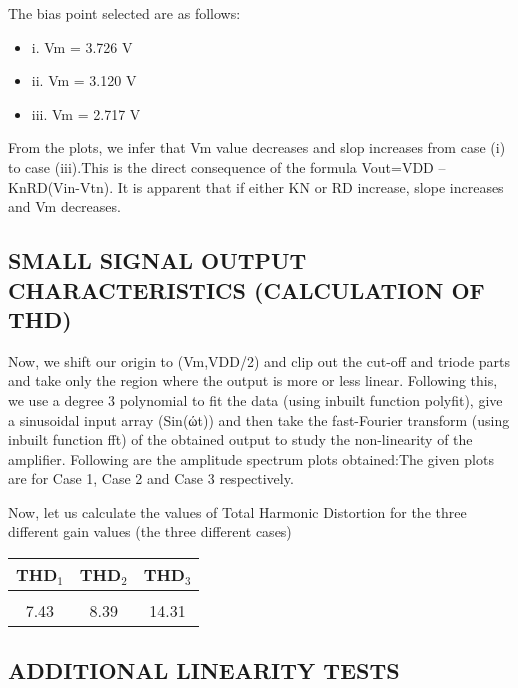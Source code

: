 \documentclass[12pt]{article}
\begin{document}
The bias point selected are as follows:

\begin{itemize}
\item i. Vm = 3.726 V

\item ii. Vm = 3.120 V

\item iii. Vm = 2.717 V
\end{itemize}

From the plots, we infer that Vm value decreases and slop increases from case (i) to case (iii).This is the direct consequence of the formula Vout=VDD – KnRD(Vin-Vtn). It is apparent that if either KN or RD increase, slope increases and Vm decreases.


\subsection*{SMALL SIGNAL OUTPUT CHARACTERISTICS (CALCULATION OF THD)}

Now, we shift our origin to (Vm,VDD/2) and clip out the cut-off and triode parts and take only the region where the output is more or less linear. Following this, we use a degree 3 polynomial to fit the data (using inbuilt function polyfit), give a sinusoidal input array (Sin(ώt)) and then take the fast-Fourier transform (using inbuilt function fft) of the obtained output to study the non-linearity of the amplifier. Following are the amplitude spectrum plots obtained:The given plots are for Case 1, Case 2 and Case 3 respectively.

Now, let us calculate the values of Total Harmonic Distortion for the three
different gain values (the three different cases)
\begin{center}
 \begin{tabular}{|| c | c| c ||}
 \hline
 \hline
 THD$_1$ & THD$_2$ & THD$_3$ \\
 \hline\hline\\
 7.43 & 8.39 & 14.31\\
 \hline
\end{tabular}
\end{center}
 
\subsection*{ ADDITIONAL LINEARITY TESTS }
\end{document}
